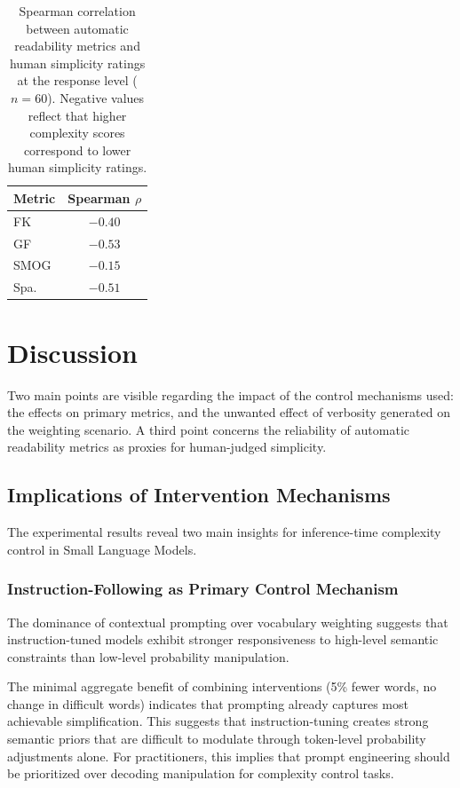 \documentclass[10pt, a4paper]{article}
\begin{document}
\begin{table}[!ht]
\begin{center}
\begin{tabular}{lc}
\hline
\textbf{Metric} & \textbf{Spearman $\rho$} \\
\hline
FK   & $-0.40$ \\
GF   & $-0.53$ \\
SMOG & $-0.15$ \\
Spa. & $-0.51$ \\
\hline
\end{tabular}
\caption{Spearman correlation between automatic readability metrics and human simplicity ratings at the response level ($n=60$). Negative values reflect that higher complexity scores correspond to lower human simplicity ratings.}
\label{tab:metric-correlation}
\end{center}
\end{table}

\section{Discussion}
Two main points are visible regarding the impact of the control mechanisms used: the effects on primary metrics, and the unwanted effect of verbosity generated on the weighting scenario. A third point concerns the reliability of automatic readability metrics as proxies for human-judged simplicity.

\subsection{Implications of Intervention Mechanisms}

The experimental results reveal two main insights for inference-time complexity control in Small Language Models.

\subsubsection{Instruction-Following as Primary Control Mechanism}

The dominance of contextual prompting over vocabulary weighting suggests that instruction-tuned models exhibit stronger responsiveness to high-level semantic constraints than low-level probability manipulation.

The minimal aggregate benefit of combining interventions (5\% fewer words, no change in difficult words) indicates that prompting already captures most achievable simplification. This suggests that instruction-tuning creates strong semantic priors that are difficult to modulate through token-level probability adjustments alone. For practitioners, this implies that prompt engineering should be prioritized over decoding manipulation for complexity control tasks.
\end{document}
